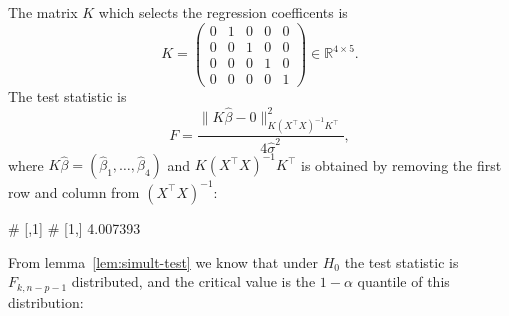 \documentclass[
  a4paper,
]{article}
\newenvironment{Shaded}{\begin{snugshade}}{\end{snugshade}}
\newcommand{\DecValTok}[1]{\textcolor[rgb]{0.00,0.00,0.81}{#1}}
\newcommand{\FunctionTok}[1]{\textcolor[rgb]{0.00,0.00,0.00}{#1}}
\newcommand{\NormalTok}[1]{#1}
\newcommand{\OtherTok}[1]{\textcolor[rgb]{0.56,0.35,0.01}{#1}}
\newcommand{\SpecialCharTok}[1]{\textcolor[rgb]{0.00,0.00,0.00}{#1}}
\theoremstyle{definition}
\theoremstyle{definition}
\theoremstyle{definition}
\theoremstyle{definition}
\theoremstyle{remark}
\begin{document}
The matrix \(K\) which selects the regression coefficents
is
\begin{equation*}
  K
  = \begin{pmatrix}
    0 & 1 & 0 & 0 & 0 \\
    0 & 0 & 1 & 0 & 0 \\
    0 & 0 & 0 & 1 & 0 \\
    0 & 0 & 0 & 0 & 1
  \end{pmatrix}
  \in \mathbb{R}^{4\times 5}.
\end{equation*}
The test statistic is
\begin{equation*}
  F
  = \frac{\bigl\| K \hat\beta - 0 \bigr\|_{K(X^\top X)^{-1} K^\top}^2}
          {4 \hat\sigma^2},
\end{equation*}
where \(K \hat\beta = (\hat\beta_1, \ldots, \hat\beta_4)\)
and \(K(X^\top X)^{-1} K^\top\) is obtained by removing the first row and
column from \((X^\top X)^{-1}\):

\begin{Shaded}
\end{Shaded}

\begin{Shaded}
\begin{Highlighting}[]
\NormalTok{\#          [,1]}
\NormalTok{\# [1,] 4.007393}
\end{Highlighting}
\end{Shaded}

From lemma~\ref{lem:simult-test} we know that under \(H_0\)
the test statistic is \(F_{k, n-p-1}\) distributed, and the
critical value is the \(1-\alpha\) quantile of this distribution:
\end{document}
